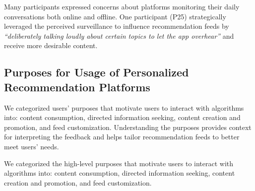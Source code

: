 

Many participants expressed concerns about platforms monitoring their daily conversations both online and offline. One participant (P25) strategically leveraged the perceived surveillance to influence recommendation feeds by \textit{``deliberately talking loudly about certain topics to let the app overhear''} and receive more desirable content. 

\subsection{Purposes for Usage of Personalized Recommendation Platforms}
We categorized users' purposes that motivate users to interact with algorithms into: content consumption, directed information seeking, content creation and promotion, and feed customization. Understanding the purposes provides context for interpreting the feedback and helps tailor recommendation feeds to better meet users' needs. 

We categorized the high-level purposes that motivate users to interact with algorithms into: content consumption, directed information seeking, content creation and promotion, and feed customization.

